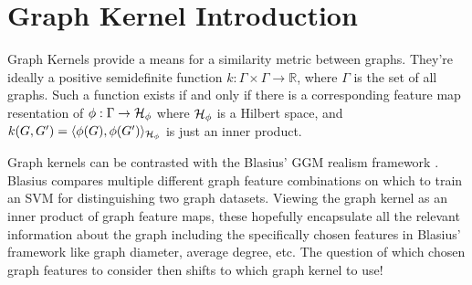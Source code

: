   
  



\section{Graph Kernel Introduction}
Graph Kernels provide a means for a similarity metric between graphs. They're ideally a positive semidefinite function $k: \Gamma \times \Gamma \rightarrow \mathbb{R}$, where $\Gamma$ is the set of all graphs. Such a function exists if and only if there is a corresponding feature map resentation of $\phi: \Gamma \to \mathcal{H}_\phi$ where $\mathcal{H}_\phi$ is a Hilbert space, and $k(G, G') = \langle \phi(G), \phi(G') \rangle_{\mathcal{H}_\phi}$ is just an inner product.

Graph kernels can be contrasted with the Blasius' GGM realism framework . Blasius compares multiple different graph feature combinations on which to train an SVM for distinguishing two graph datasets.
Viewing the graph kernel as an inner product of graph feature maps, these hopefully encapsulate all the relevant information about the graph including the specifically chosen features in Blasius' framework like graph diameter, average degree, etc. The question of which chosen graph features to consider then shifts to which graph kernel to use!




